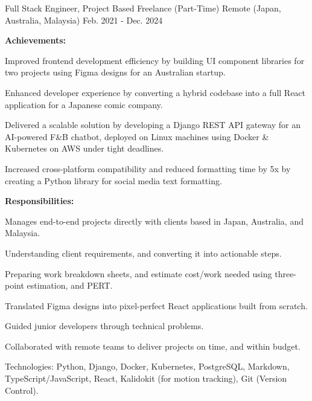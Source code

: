 \begin{cventries}
  \cventry
    {Full Stack Engineer, Project Based} %
    {Freelance (Part-Time)} %
    {Remote (Japan, Australia, Malaysia)} %
    {Feb. 2021 - Dec. 2024} %
    {
      \textbf{Achievements:}
      \vspace{1.5em}
      \begin{cvitems} %
        \item {Improved frontend development efficiency by building UI component libraries for two projects using Figma designs for an Australian startup.}
        \item {Enhanced developer experience by converting a hybrid codebase into a full React application for a Japanese comic company.}
        \item {Delivered a scalable solution by developing a Django REST API gateway for an AI-powered F\&B chatbot, deployed on Linux machines using Docker \& Kubernetes on AWS under tight deadlines.}
        \item {Increased cross-platform compatibility and reduced formatting time by 5x by creating a Python library for social media text formatting.}
      \end{cvitems}
      \vspace{1.5em}
      \textbf{Responsibilities:}
      \vspace{1.5em}
      \begin{cvitems} %
        \item {Manages end-to-end projects directly with clients based in Japan, Australia, and Malaysia.}
        \item {Understanding client requirements, and converting it into actionable steps.}
        \item {Preparing work breakdown sheets, and estimate cost/work needed using three-point estimation, and PERT.}
        \item {Translated Figma designs into pixel-perfect React applications built from scratch.}
        \item {Guided junior developers through technical problems.}
        \item {Collaborated with remote teams to deliver projects on time, and within budget.}
        \item {Technologies: Python, Django, Docker, Kubernetes, PostgreSQL, Markdown, TypeScript/JavaScript, React, Kalidokit (for motion tracking), Git (Version Control).}
      \end{cvitems}
    }


\end{cventries}
